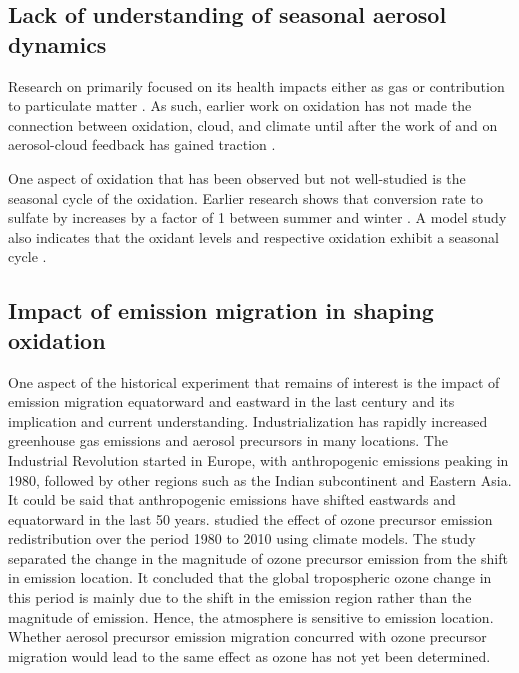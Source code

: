 \subsection{Lack of understanding of seasonal aerosol dynamics}
Research on  primarily focused on its health impacts either as  gas or contribution to particulate matter \citep[e.g. ][]{meagherSeasonalVariationAtmospheric1983,eatoughConversionSO2Sulfate1994, feichterSimulationTroposphericSulfur1996} . As such, earlier work on  oxidation has not made the connection between  oxidation, cloud, and climate until after the work of \citet{twomeyInfluencePollutionShortwave1977} and \citet{albrechtAerosolsCloudMicrophysics1989} on aerosol-cloud feedback has gained traction .  

One aspect of  oxidation that has been observed but not well-studied is the seasonal cycle of the oxidation. Earlier research shows that  conversion rate to sulfate by  increases by a factor of 1 between summer and winter \citet{meagherSeasonalVariationAtmospheric1983}. A model study also indicates that the oxidant levels and respective oxidation exhibit a seasonal cycle \citet{feichterSimulationTroposphericSulfur1996}. 


\subsection{Impact of emission migration in shaping \textsoo{} oxidation}

One aspect of the historical experiment that remains of interest is the impact of emission migration equatorward and eastward in the last century and its implication and current understanding. Industrialization has rapidly increased greenhouse gas emissions and aerosol precursors in many locations. The Industrial Revolution started in Europe, with anthropogenic emissions peaking in 1980, followed by other regions such as the Indian subcontinent and Eastern Asia. It could be said that anthropogenic emissions have shifted eastwards and equatorward in the last 50 years. \citet{zhangTroposphericOzoneChange2016} studied the effect of ozone precursor emission redistribution over the period 1980 to 2010 using climate models. The study separated the change in the magnitude of ozone precursor emission from the shift in emission location. It concluded that the global tropospheric ozone change in this period is mainly due to the shift in the emission region rather than the magnitude of emission. Hence, the atmosphere is sensitive to emission location. Whether aerosol precursor emission migration concurred with ozone precursor migration would lead to the same effect as ozone has not yet been determined.



